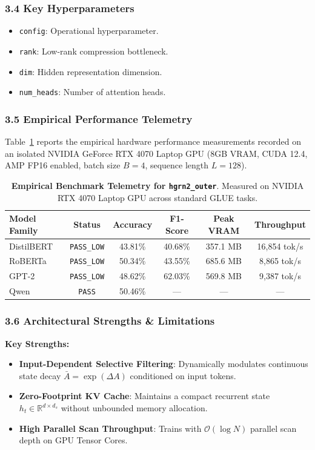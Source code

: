 \subsubsection*{3.4 Key Hyperparameters}
\begin{itemize}
    \item \texttt{config}: Operational hyperparameter.
    \item \texttt{rank}: Low-rank compression bottleneck.
    \item \texttt{dim}: Hidden representation dimension.
    \item \texttt{num\_heads}: Number of attention heads.
\end{itemize}

\subsubsection*{3.5 Empirical Performance Telemetry}
Table~\ref{tab:telemetry_hgrn2_outer} reports the empirical hardware performance measurements recorded on an isolated NVIDIA GeForce RTX 4070 Laptop GPU (8GB VRAM, CUDA 12.4, AMP FP16 enabled, batch size $B=4$, sequence length $L=128$).

\begin{table}[h]
\centering
\small
\caption{\textbf{Empirical Benchmark Telemetry for \texttt{hgrn2\_outer}}. Measured on NVIDIA RTX 4070 Laptop GPU across standard GLUE tasks.}
\label{tab:telemetry_hgrn2_outer}
\begin{tabular*}{\columnwidth}{@{\extracolsep{\fill}}lccccc}
\toprule
\textbf{Model Family} & \textbf{Status} & \textbf{Accuracy} & \textbf{F1-Score} & \textbf{Peak VRAM} & \textbf{Throughput} \\
\midrule
DistilBERT & \texttt{PASS\_LOW} & 43.81\% & 40.68\% & 357.1 MB & 16,854 tok/s \\
RoBERTa & \texttt{PASS\_LOW} & 50.34\% & 43.55\% & 685.6 MB & 8,865 tok/s \\
GPT-2 & \texttt{PASS\_LOW} & 48.62\% & 62.03\% & 569.8 MB & 9,387 tok/s \\
Qwen & \texttt{PASS} & 50.46\% & --- & --- & --- \\
\bottomrule
\end{tabular*}
\end{table}

\subsubsection*{3.6 Architectural Strengths \& Limitations}
\textbf{Key Strengths:}
\begin{itemize}
    \item \textbf{Input-Dependent Selective Filtering}: Dynamically modulates continuous state decay $\bar{A} = \exp(\Delta A)$ conditioned on input tokens.
    \item \textbf{Zero-Footprint KV Cache}: Maintains a compact recurrent state $h_t \in \mathbb{R}^{d \times d_s}$ without unbounded memory allocation.
    \item \textbf{High Parallel Scan Throughput}: Trains with $\mathcal{O}(\log N)$ parallel scan depth on GPU Tensor Cores.
\end{itemize}

